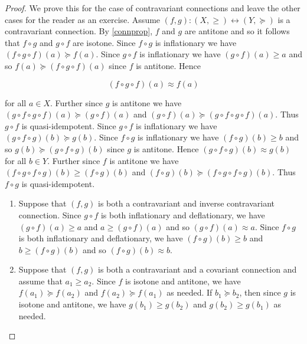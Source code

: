 \documentclass[
  letterpaper,
  10pt,
  reqno,
  twopage,
  openany]{book}
\providecommand{\tightlist}{%
  \setlength{\itemsep}{0pt}\setlength{\parskip}{0pt}}\usepackage{longtable,booktabs,array}
\theoremstyle{plain}
\theoremstyle{definition}
\theoremstyle{definition}
\theoremstyle{definition}
\theoremstyle{plain}
\theoremstyle{plain}
\theoremstyle{remark}
\begin{document}
\begin{proof}

We prove this for the case of contravariant connections and leave the
other cases for the reader as an exercise. Assume
\({(f,g):(X,\geq) \leftrightarrow (Y,\succeq)}\) is a contravariant
connection. By \ref{connprop}, \(f\) and \(g\) are antitone and so it
follows that \(f\circ g\) and \(g\circ f\) are isotone. Since
\({f\circ g}\) is inflationary we have
\({(f\circ g\circ f)(a)\succeq f(a)}\). Since \(g\circ f\) is
inflationary we have \({(g\circ f)(a)\geq a}\) and so
\(f(a)\succeq (f\circ g\circ f)(a)\) since \(f\) is antitone. Hence

\begin{equation}
\label{equivclosure}
{(f\circ g\circ f)(a)\approx f(a)}
\end{equation}

for all \(a\in X\). Further since \(g\) is antitone we have
\((g\circ f\circ g\circ f)(a) \succeq (g\circ f)(a)\) and
\({(g\circ f)(a) \succeq (g\circ f\circ g\circ f)(a)}\). Thus
\(g\circ f\) is quasi-idempotent. Since \(g\circ f\) is inflationary we
have \({(g\circ f\circ g)(b)\succeq g(b)}\). Since \(f\circ g\) is
inflationary we have \({(f\circ g)(b)\geq b}\) and so
\({g(b)\succeq (g\circ f\circ g)(b)}\) since \(g\) is antitone. Hence
\({(g\circ f\circ g)(b)\approx g(b)}\) for all \(b\in Y\). Further since
\(f\) is antitone we have
\((f\circ g\circ f\circ g)(b) \geq (f\circ g)(b)\) and
\({(f\circ g)(b) \succeq (f\circ g\circ f\circ g)(b)}\). Thus
\(f\circ g\) is quasi-idempotent.

\begin{enumerate}
\def\labelenumi{\arabic{enumi}.}
\tightlist
\item
  Suppose that \((f,g)\) is both a contravariant and inverse
  contravariant connection. Since \(g\circ f\) is both inflationary and
  deflationary, we have \((g\circ f)(a)\geq a\) and
  \(a\geq (g\circ f)(a)\) and so \((g\circ f)(a)\approx a\). Since
  \(f\circ g\) is both inflationary and deflationary, we have
  \((f\circ g)(b)\geq b\) and \(b\geq (f\circ g)(b)\) and so
  \((f\circ g)(b)\approx b\).
\item
  Suppose that \((f,g)\) is both a contravariant and a covariant
  connection and assume that \(a_1\geq a_2\). Since \(f\) is isotone and
  antitone, we have \(f(a_1)\succeq f(a_2)\) and
  \(f(a_2)\succeq f(a_1)\) as needed. If \(b_1\succeq b_2\), then since
  \(g\) is isotone and antitone, we have \(g(b_1)\geq g(b_2)\) and
  \(g(b_2)\geq g(b_1)\) as needed.
\end{enumerate}

\end{proof}
\end{document}
